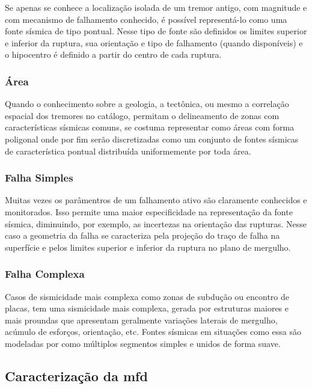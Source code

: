 Se apenas se conhece a localização isolada de um tremor antigo, com magnitude e com mecanismo de falhamento conhecido,
é possível representá-lo como uma fonte sísmica de tipo pontual. Nesse tipo de fonte são definidos os limites superior e
inferior da ruptura, sua orientação e tipo de falhamento (quando disponíveis) e o hipocentro é definido a partir do
centro de cada ruptura.

\subsubsection{Área}
\label{sec:area_source}

Quando o conhecimento sobre a geologia, a tectônica, ou mesmo a correlação espacial dos tremores no catálogo, permitam
o delineamento de zonas com características sísmicas comuns, se costuma representar como áreas com forma poligonal onde
por fim serão discretizadas como um conjunto de fontes sísmicas de característica pontual distribuída uniformemente por
toda área.

\subsubsection{Falha Simples}
\label{sec:simple_fault_source}

Muitas vezes os parâmentros de um falhamento ativo são claramente conhecidos e monitorados. Isso permite uma maior
especificidade na representação da fonte sísmica, diminuindo, por exemplo, as incertezas na orientação das rupturas.
Nesse caso a geometria da falha se caracteriza pela projeção do traço de falha na superfície e pelos limites superior e
inferior da ruptura no plano de mergulho.


\subsubsection{Falha Complexa}
\label{sec:complex_fault_source}

Casos de sismicidade mais complexa como zonas de subdução ou encontro de placas, tem uma sismicidade mais complexa,
gerada por estruturas maiores e mais proundas que apresentam geralmente variações laterais de mergulho, acúmulo de
esforços, orientação, etc. Fontes sísmicas em situações como essa são modeladas por como múltiplos segmentos simples e
unidos de forma suave.


\subsection{Caracterização da \gls{mfd}}
\label{sec:psha_mfd}

